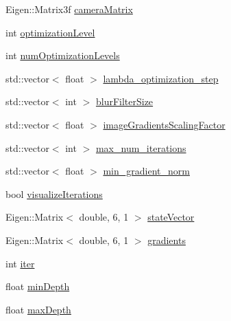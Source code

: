 \begin{DoxyCompactItemize}
\item 
Eigen::Matrix3f \hyperlink{class_photoconsistency_odometry_1_1_analytic_1_1_c_photoconsistency_odometry_analytic_a6338098cb3cee04a59768a27b84e29e0}{cameraMatrix}
\item 
int \hyperlink{class_photoconsistency_odometry_1_1_analytic_1_1_c_photoconsistency_odometry_analytic_a52b80772f2fabe73161055dc84ce2687}{optimizationLevel}
\item 
int \hyperlink{class_photoconsistency_odometry_1_1_analytic_1_1_c_photoconsistency_odometry_analytic_a23743290709f60c13f55b7a9664ae30d}{numOptimizationLevels}
\item 
std::vector$<$ float $>$ \hyperlink{class_photoconsistency_odometry_1_1_analytic_1_1_c_photoconsistency_odometry_analytic_a0c9b0540f2697f7b137b1a36ce3e2c18}{lambda\_\-optimization\_\-step}
\item 
std::vector$<$ int $>$ \hyperlink{class_photoconsistency_odometry_1_1_analytic_1_1_c_photoconsistency_odometry_analytic_abc3f7da046ef73b3cd4b8a4ad5abf441}{blurFilterSize}
\item 
std::vector$<$ float $>$ \hyperlink{class_photoconsistency_odometry_1_1_analytic_1_1_c_photoconsistency_odometry_analytic_adb99f12e7b9b1aa4b31b766b51e8a3c0}{imageGradientsScalingFactor}
\item 
std::vector$<$ int $>$ \hyperlink{class_photoconsistency_odometry_1_1_analytic_1_1_c_photoconsistency_odometry_analytic_ac84492170047058895b65f8b3f7d72a2}{max\_\-num\_\-iterations}
\item 
std::vector$<$ float $>$ \hyperlink{class_photoconsistency_odometry_1_1_analytic_1_1_c_photoconsistency_odometry_analytic_a0c34a8b704b2340114f16e98dcc33238}{min\_\-gradient\_\-norm}
\item 
bool \hyperlink{class_photoconsistency_odometry_1_1_analytic_1_1_c_photoconsistency_odometry_analytic_a100c9755e220fe7cc1cdba95211fb506}{visualizeIterations}
\item 
Eigen::Matrix$<$ double, 6, 1 $>$ \hyperlink{class_photoconsistency_odometry_1_1_analytic_1_1_c_photoconsistency_odometry_analytic_a46fc9664879ed9582eb173709fba3924}{stateVector}
\item 
Eigen::Matrix$<$ double, 6, 1 $>$ \hyperlink{class_photoconsistency_odometry_1_1_analytic_1_1_c_photoconsistency_odometry_analytic_ae1c72bf91edb0171331fb9c729dec27b}{gradients}
\item 
int \hyperlink{class_photoconsistency_odometry_1_1_analytic_1_1_c_photoconsistency_odometry_analytic_a8eea3326f2d11a5a30e53b171464ccb2}{iter}
\item 
float \hyperlink{class_photoconsistency_odometry_1_1_analytic_1_1_c_photoconsistency_odometry_analytic_a7b34e994ff1b81ae11e3211636045171}{minDepth}
\item 
float \hyperlink{class_photoconsistency_odometry_1_1_analytic_1_1_c_photoconsistency_odometry_analytic_a473668de10bebdfbd3c863cba5bf22c6}{maxDepth}
\end{DoxyCompactItemize}


